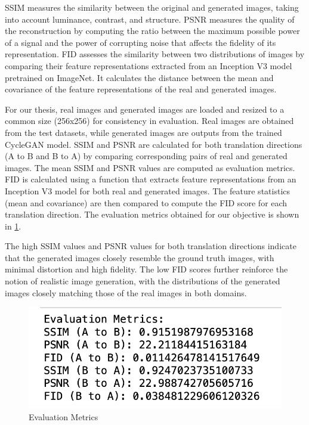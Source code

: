 \documentclass[UKenglish,12pt]{master-style}
\begin{document}
SSIM measures the similarity between the original and generated  images, taking into account luminance, contrast, and structure. PSNR measures the quality of the reconstruction by computing the ratio between the maximum possible power of a signal and the power of corrupting noise that affects the fidelity of its representation. FID assesses the similarity between two distributions of images by comparing their feature representations extracted from an Inception V3 model pretrained on ImageNet. It calculates the distance between the mean and covariance of the feature representations of the real and generated images.

For our thesis, real images and generated images are loaded and resized to a common size (256x256) for consistency in evaluation. Real images are obtained from the test datasets, while generated images are outputs from the trained CycleGAN model. SSIM and PSNR are calculated for both translation directions (A to B and B to A) by comparing corresponding pairs of real and generated images. The mean SSIM and PSNR values are computed as evaluation metrics. FID is calculated using a function that extracts feature representations from an Inception V3 model for both real and generated images. The feature statistics (mean and covariance) are then compared to compute the FID score for each translation direction. The evaluation metrics obtained for our objective is shown in \ref{fig:Evaluation Metrics}.

The high SSIM values and PSNR values for both translation directions indicate that the generated images closely resemble the ground truth images, with minimal distortion and high fidelity. The low FID scores further reinforce the notion of realistic image generation, with the distributions of the generated images closely matching those of the real images in both domains.

\begin{figure}[htbp]
    \centering
    \includegraphics[width=1\textwidth]{Images/Evaluation Metrics.png}
    \caption{Evaluation Metrics}
    \label{fig:Evaluation Metrics}
\end{figure}
\end{document}
